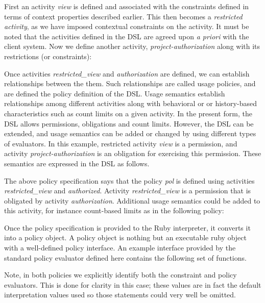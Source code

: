First an activity {\em view} is defined and associated with the constraints defined in terms of context properties described earlier.  This then becomes a {\em restricted activity}, as we have imposed contextual constraints on the activity.  It must be noted that the activities defined in the DSL are agreed upon {\em a priori} with the client system. Now we define another activity, {\em project-authorization} along with its restrictions (or constraints):



Once activities {\em restricted\_view} and {\em authorization} are defined, we can establish relationships between the them. Such relationships are called usage policies, and are defined the policy definition of the DSL. Usage semantics establish relationships among different activities along with behavioral or or history-based characteristics such as count limits on a given activity. In the present form, the DSL allows permissions, obligations and count limits. However, the DSL can be extended, and usage semantics can be added or changed by using different types of evaluators. In this example, restricted activity {\em view} is a permission, and activity {\em project-authorization} is an obligation for exercising this permission. These semantics are expressed in the DSL as follows. 



The above policy specification says that the policy {\em pol} is defined using activities {\em restricted\_view} and {\em authorized}.  Activity {\em restricted\_view} is a permission that is obligated by activity {\em authorization}.  Additional usage semantics could be added to this activity, for instance count-based limits as in the following policy:



Once the policy specification is provided to the Ruby interpreter, it converts it into a policy object. A policy object is nothing but an executable ruby object with a well-defined policy interface. An example interface provided by the standard policy evaluator defined here contains the following set of functions.

Note, in both policies we explicitly identify both the constraint and policy evaluators.  This is done for clarity in this case; these values are in fact the default interpretation values used so those statements could very well be omitted.

